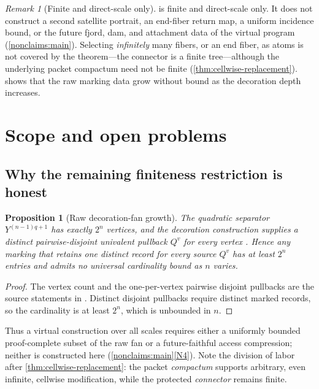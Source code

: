 \documentclass[11pt,reqno]{amsart}
\numberwithin{equation}{section}
\theoremstyle{plain}
\newtheorem{proposition}[theorem]{Proposition}
\theoremstyle{definition}
\theoremstyle{remark}
\newtheorem{remark}[theorem]{Remark}
\begin{document}
\begin{remark}[Finite and direct-scale only]
\label{rem:carrier-scope}
 is finite and direct-scale only.  It does
not construct a second satellite portrait, an end-fiber return map, a
uniform incidence bound, or the future fjord, dam, and attachment data
of the virtual program (\cref{nonclaims:main}).  Selecting
\emph{infinitely} many fibers, or an end fiber, as atoms is not
covered by the theorem---the connector is a finite tree---although the
underlying packet compactum need not be finite
(\cref{thm:cellwise-replacement}).   shows that
the raw marking data grow without bound as the decoration depth
increases.
\end{remark}

\section{Scope and open problems}
\label{sec:scope}

\subsection{Why the remaining finiteness restriction is honest}

\begin{proposition}[Raw decoration-fan growth]
\label{prop:fan-growth}
The quadratic separator $Y^{(n-1)q+1}$ has exactly $2^n$ vertices, and
the decoration construction supplies a distinct pairwise-disjoint
univalent pullback $Q^v$ for every vertex \cite{KLDecorations08}.
Hence any marking that retains one distinct record for every source
$Q^v$ has at least $2^n$ entries and admits no universal cardinality
bound as $n$ varies.
\end{proposition}

\begin{proof}
The vertex count and the one-per-vertex pairwise disjoint pullbacks are
the source statements in \cite{KLDecorations08}.  Distinct disjoint
pullbacks require distinct marked records, so the cardinality is at
least $2^n$, which is unbounded in $n$.
\end{proof}

Thus a virtual construction over all scales requires either a uniformly
bounded proof-complete subset of the raw fan or a future-faithful
access compression; neither is constructed here
(\cref{nonclaims:main}\ref{N4}).  Note the division of labor after
\cref{thm:cellwise-replacement}: the packet \emph{compactum} supports
arbitrary, even infinite, cellwise modification, while the protected
\emph{connector} remains finite.
\end{document}
